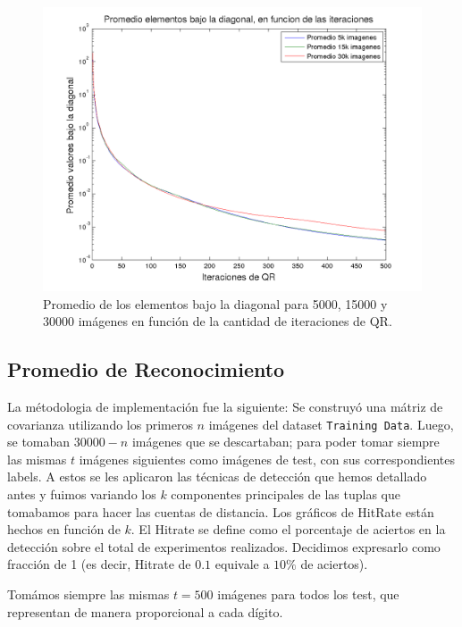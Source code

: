 \begin{figure}[H]
\begin {center}
\includegraphics[width=\hrwidth]{plots/PROM.png}
\end {center}
\caption{Promedio de los elementos bajo la diagonal para 5000, 15000 y 30000 im\'agenes
en funci\'on de la cantidad de iteraciones de QR.}
\label{fig:PROM}
\end{figure}


\subsection{Promedio de Reconocimiento}
La m\'etodologia de implementaci\'on fue la siguiente: Se construy\'o una
m\'atriz de covarianza utilizando los primeros $n$ im\'agenes del dataset
\texttt{Training Data}. Luego, se tomaban $30000-n$ im\'agenes que se descartaban; para poder tomar 
siempre las mismas $t$ im\'agenes siguientes como im\'agenes de test, con sus 
correspondientes labels. A estos se les aplicaron las t\'ecnicas
de detecci\'on que hemos detallado antes y fuimos variando los $k$ componentes principales 
de las tuplas que tomabamos para hacer las cuentas de distancia.
Los gr\'aficos de HitRate est\'an hechos en funci\'on de $k$.
El Hitrate se define como el porcentaje de aciertos en la detecci\'on sobre el total de 
experimentos realizados. Decidimos expresarlo como fracci\'on de 1 (es decir,
Hitrate de $0.1$ equivale a $10\%$ de aciertos).

Tom\'amos siempre las mismas $t=500$ im\'agenes para todos los test, que representan
de manera proporcional a cada d\'igito.

